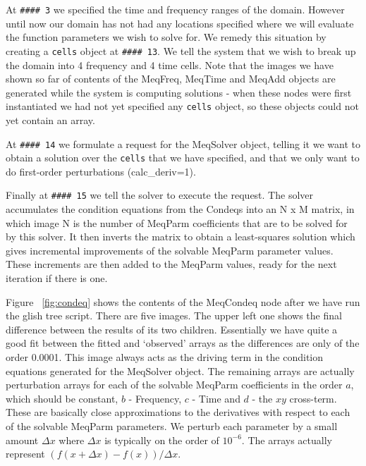 \documentclass[10pt]{article}
\begin{document}
At {\tt \#\#\#\# 3} we specified the time and frequency ranges of the
domain. However until now our domain has not had any locations specified
where we will evaluate the function parameters we wish to solve for. We
remedy this situation by creating a {\tt cells} object at {\tt \#\#\#\# 13}.
We tell the system that we wish to break up the domain into 
4 frequency and 4 time cells. Note that the images we have shown so far
of contents of the MeqFreq, MeqTime and MeqAdd objects are generated while
the system is computing solutions - when these nodes were first 
instantiated we had not yet specified any {\tt cells} object, so these
objects could not yet contain an array.


At {\tt \#\#\#\# 14} we formulate a request for the MeqSolver object,
telling it we want to obtain a solution over the {\tt cells} that
we have specified, and that we only want to do first-order
perturbations (calc\_deriv=1).

Finally at {\tt \#\#\#\# 15} we tell the solver to execute the
request. 
The solver accumulates the condition equations from the Condeqs into
an N x M matrix, in which image N is the number of MeqParm coefficients
that are to be solved for by this solver. It then inverts the matrix
to obtain a least-squares solution which gives incremental improvements of
the solvable MeqParm parameter values. These increments are then added to the
MeqParm values, ready for the next iteration if there is one.

Figure ~\ref{fig:condeq} shows the contents of the MeqCondeq
node after we have run the glish tree script. There are five
images. The upper left one shows the final difference between
the results of its two children. Essentially we have quite
a good fit between the fitted and `observed' arrays 
as the differences are only of the order 0.0001. This image
always acts as the driving term in the condition equations
generated for the MeqSolver object. The remaining arrays
are actually perturbation arrays for each of the solvable
MeqParm coefficients in the order $a$, which should be constant,
$b$ - Frequency, $c$ - Time and $d$ - the $xy$ cross-term. These
are basically close approximations to the derivatives with respect to
each of the solvable MeqParm parameters. We perturb each parameter
by a small amount $\Delta x$ where $\Delta x$ is typically on
the order of $10^{-6}$.
The arrays actually represent $ (f(x+\Delta x) -f(x))/\Delta x$.
\end{document}

